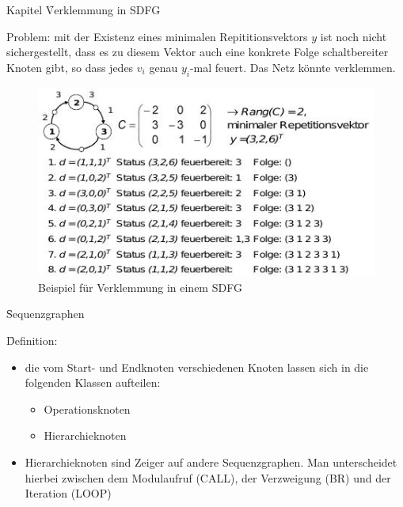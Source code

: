 \begin{chapter}{Kapitel}
\newpage
\f{Verklemmung in SDFG}

\noindent Problem: mit der Existenz eines minimalen Repititionsvektors $y$ ist noch nicht sichergestellt, dass es zu diesem Vektor auch eine konkrete Folge 
schaltbereiter Knoten gibt, so dass jedes $v_i$ genau $y_i$-mal feuert. Das Netz könnte verklemmen. 
\begin{figure}[!ht]
 \centering
 \includegraphics[scale=0.8]{pics/minRepVecVerkl}
 \caption{Beispiel für Verklemmung in einem SDFG}
\end{figure}

\f{Sequenzgraphen}

\noindent \f{Definition}: 
\begin{itemize}
 \item die vom Start- und Endknoten verschiedenen Knoten lassen sich in die folgenden Klassen aufteilen:
 \begin{itemize}
  \item Operationsknoten 
  \item Hierarchieknoten
 \end{itemize}
 \item Hierarchieknoten sind Zeiger auf andere Sequenzgraphen. Man unterscheidet hierbei zwischen dem Modulaufruf (CALL), der Verzweigung (BR) und der Iteration 
 (LOOP) 
\end{itemize}



\end{chapter}
